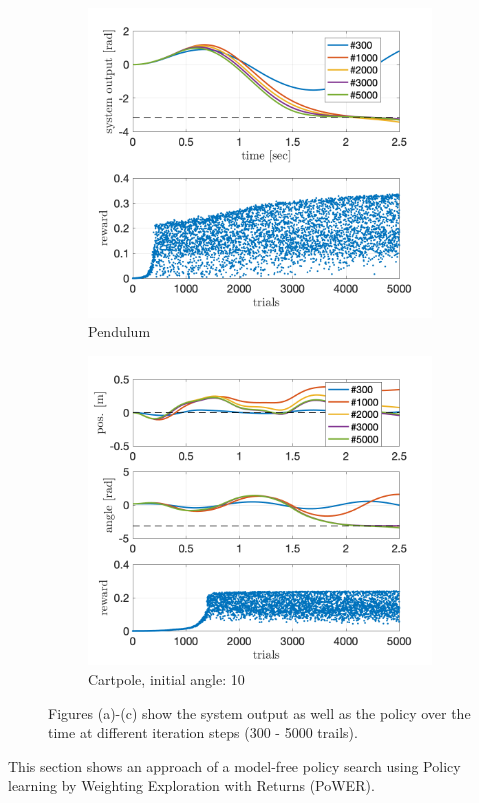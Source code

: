\documentclass[letterpaper, 10 pt, conference]{ieeeconf}  %
\begin{document}
\begin{figure}[!thp]
\begin{subfigure}{0.325\textwidth}
	\includegraphics[width=\textwidth]{julia_pend_quad_with_2000trials.png}
	\caption{Pendulum \newline}\label{fig:PoWER_pendulum}
	\end{subfigure}
	\begin{subfigure}{0.325\textwidth}
	\includegraphics[width=\textwidth]{julia_cp10_quad_with_2000trials.png}
	\caption{Cartpole, initial angle: 10\textdegree}\label{fig:PoWER_cp}
	\end{subfigure}\caption{Figures (a)-(c) show the system output as well as the policy over the time at different iteration steps (300 - 5000 trails).}\label{fig:PoWER}
\end{figure} 
This section shows an approach of a model-free policy search using Policy learning by Weighting Exploration with Returns (PoWER).
\end{document}
